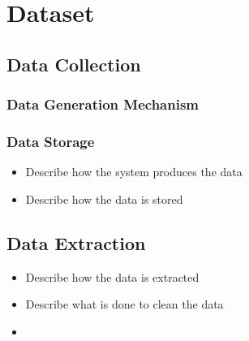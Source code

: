 \chapter{Dataset}

\section{Data Collection}
\subsection{Data Generation Mechanism}
\subsection{Data Storage}
\begin{itemize}
\item Describe how the system produces the data
\item Describe how the data is stored
\end{itemize}

\section{Data Extraction}
\begin{itemize}
\item Describe how the data is extracted
\item Describe what is done to clean the data
\item 
\end{itemize}
